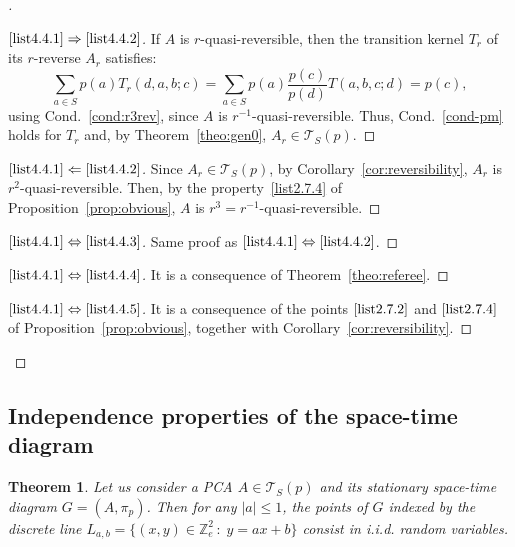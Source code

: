 \documentclass[10pt]{amsart}
\newtheorem{theo}{Theorem}[section]
\theoremstyle{definition}\newtheorem{defi}[theo]{Definition}\newtheorem{rema}[theo]{Remark}\newtheorem{exam}[theo]{Example}\newtheorem{exem}[theo]{Example}\newtheorem{nota}[theo]{Notation}
\newcounter{a}
\newcommand{\Cond}{Cond.}
\newcommand{\triang}[2]{\mathcal{T}_{#1} \left(#2 \right)}
\newcommand{\triangE}[1]{\mathcal{T}_{#1}}
\newcommand{\Z}{\mathbb{Z}}
\newenvironment{proofc}[1][\proofname]{\begin{proof}[{#1}]}{\end{proof}}
\begin{document}
\begin{proofc}
\begin{proof}[$\eqref{list4.4.1} \Rightarrow \eqref{list4.4.2}$] If $A$ is $r$-quasi-reversible, then the transition kernel $T_r$ of its $r$-reverse $A_r$ satisfies:
\[
\sum_{a\in S} p(a) T_r(d,a,b;c) = \sum_{a\in S} p(a)\frac{p(c)}{p(d)}T(a,b,c;d) = p(c),
\]
using \Cond~\ref{cond:r3rev}, since $A$ is $r^{-1}$-quasi-reversible. Thus, \Cond~\ref{cond-pm} holds for $T_r$ and, by Theorem~\ref{theo:gen0}, $A_r \in \triang{S}{p}$.
\let\qed\relax
\end{proof}
\begin{proof}[$\eqref{list4.4.1} \Leftarrow \eqref{list4.4.2}$] Since $A_r \in \triang{S}{p}$, by Corollary~\ref{cor:reversibility}, $A_r$ is $r^2$-quasi-reversible. Then, by the property~\eqref{list2.7.4}  of Proposition~\ref{prop:obvious}, $A$ is $r^3=r^{-1}$-quasi-reversible.
\let\qed\relax
\end{proof}
\begin{proof}[$\eqref{list4.4.1} \Leftrightarrow \eqref{list4.4.3}$] Same proof as $\eqref{list4.4.1} \Leftrightarrow \eqref{list4.4.2}$.
\let\qed\relax
\end{proof}
\begin{proof}[$\eqref{list4.4.1} \Leftrightarrow \eqref{list4.4.4}$] It is a consequence of Theorem~\ref{theo:referee}.
\let\qed\relax
\end{proof}
\begin{proof}[$\eqref{list4.4.1} \Leftrightarrow \eqref{list4.4.5}$] It is a consequence of the points $\eqref{list2.7.2}$ and $\eqref{list2.7.4}$ of Proposition~\ref{prop:obvious}, together with Corollary~\ref{cor:reversibility}.
\end{proof}
\let\qed\relax
\end{proofc}

\subsection{Independence properties of the space-time diagram} \label{sec:ind}

\begin{theo}\label{theo:iid_lines}
Let us consider a PCA $A \in \triangE{S}(p)$ and its stationary space-time diagram $G=(A,\pi_p)$. Then for any $|a|\leq 1$, the points of $G$ indexed by the discrete line $L_{a,b}=\{(x,y)\in \Z_{e}^2 \, : \; y=ax+b\}$ consist in i.i.d. random variables.
\end{theo}
\end{document}
